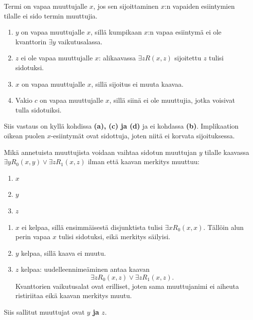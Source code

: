 \documentclass[11pt,a4paper]{amsart}
\begin{document}
\begin{solution}
  Termi on vapaa muuttujalle \(x\), jos sen sijoittaminen \(x\):n
  vapaiden esiintymien tilalle ei sido termin muuttujia.
  \leavevmode\par
  \begin{enumerate}[label=(\alph*)]
    \item \(y\) on vapaa muuttujalle \(x\), sillä kumpikaan \(x\):n
      vapaa esiintymä ei ole kvanttorin \(\exists y\) vaikutusalassa.
    \item \(z\) ei ole vapaa muuttujalle \(x\): alikaavassa
      \(\exists zR(x,z)\) sijoitettu \(z\) tulisi sidotuksi.
    \item \(x\) on vapaa muuttujalle \(x\), sillä sijoitus ei muuta kaavaa.
    \item Vakio \(c\) on vapaa muuttujalle \(x\), sillä siinä ei ole
      muuttujia, jotka voisivat tulla sidotuiksi.
  \end{enumerate}
  Siis vastaus on kyllä kohdissa \textbf{(a), (c) ja (d)} ja ei kohdassa
  \textbf{(b)}. Implikaation oikean puolen \(x\)-esiintymät ovat sidottuja,
  joten niitä ei korvata sijoituksessa.
\end{solution}

\begin{exercise}
  Mikä annetuista muuttujista voidaan vaihtaa sidotun muuttujan \(y\) tilalle
  kaavassa \(\exists yR_0(x,y) \lor \exists zR_1(x,z)\) ilman että kaavan
  merkitys muuttuu:
  \leavevmode\par
  \begin{enumerate}[label=(\alph*)]
    \item \(x\)
    \item \(y\)
    \item \(z\)
  \end{enumerate}
\end{exercise}

\begin{solution}
  \leavevmode\par
  \begin{enumerate}[label=(\alph*)]
    \item \(x\) ei kelpaa, sillä ensimmäisestä disjunktista tulisi
      \(\exists xR_0(x,x)\). Tällöin alun perin vapaa \(x\) tulisi
      sidotuksi, eikä merkitys säilyisi.
    \item \(y\) kelpaa, sillä kaava ei muutu.
    \item \(z\) kelpaa: uudelleennimeäminen antaa kaavan
      \[
        \exists zR_0(x,z)\lor\exists zR_1(x,z).
      \]
      Kvanttorien vaikutusalat ovat erilliset, joten sama muuttujanimi
      ei aiheuta ristiriitaa eikä kaavan merkitys muutu.
  \end{enumerate}
  Siis sallitut muuttujat ovat \textbf{\(y\) ja \(z\)}.
\end{solution}
\end{document}
